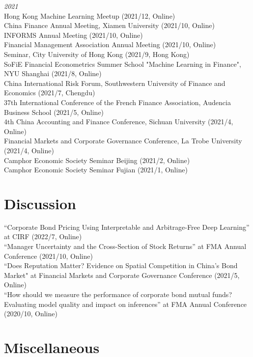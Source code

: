 \documentclass[margin]{res}
\begin{document}
\begin{resume}
\textit{2021} \\
Hong Kong Machine Learning Meetup (2021/12, Online) \\
China Finance Annual Meeting, Xiamen University (2021/10, Online) \\
INFORMS Annual Meeting (2021/10, Online) \\
Financial Management Association Annual Meeting (2021/10, Online) \\
Seminar, City University of Hong Kong (2021/9, Hong Kong) \\
SoFiE Financial Econometrics Summer School "Machine Learning in Finance", NYU Shanghai (2021/8, Online) \\
China International Risk Forum, Southwestern University of Finance and Economics  (2021/7, Chengdu) \\
37th International Conference of the French Finance Association, Audencia Business School (2021/5, Online) \\
4th China Accounting and Finance Conference, Sichuan University (2021/4, Online) \\
Financial Markets and Corporate Governance Conference, La Trobe University (2021/4, Online) \\
Camphor Economic Society Seminar Beijing (2021/2, Online) \\
Camphor Economic Society Seminar Fujian (2021/1, Online)\\


\section{\sc Discussion}

``Corporate Bond Pricing Using Interpretable and Arbitrage-Free Deep Learning'' at CIRF  (2022/7, Online)
\\
``Manager Uncertainty and the Cross-Section of Stock Returns'' at FMA Annual Conference (2021/10, Online)
\\
``Does Reputation Matter? Evidence on Spatial Competition in China’s Bond Market" at Financial Markets and Corporate Governance Conference (2021/5, Online)
\\
``How should we measure the performance of corporate bond mutual funds? Evaluating model quality and impact on inferences'' at FMA Annual Conference (2020/10, Online)
\\


\section{\sc Miscellaneous}


\end{resume}
\end{document}
